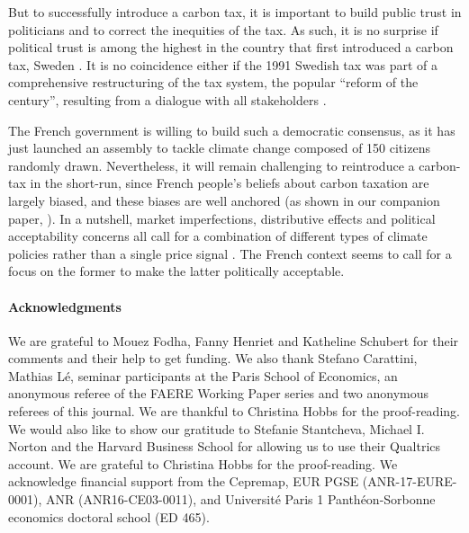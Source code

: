 \documentclass[english,5p,authoryear]{elsarticle}
\begin{document}
But to successfully introduce a carbon tax, it is important to build public trust in politicians \citep{harring_jagers_2013,rafaty_perceptions_2018} and to correct the inequities of the tax. As such, it is no surprise if political trust is among the highest in the country that first introduced a carbon tax, Sweden \citep{klenert_making_2018}. It is no coincidence either if the 1991 Swedish tax was part of a comprehensive restructuring of the tax system, the popular ``reform of the century'', resulting from a dialogue with all stakeholders \citep{sterner_environmental_2014}. 

The French government is willing to build such a democratic consensus, as it has just launched an assembly to tackle climate change composed of 150 citizens randomly drawn. Nevertheless, it will remain challenging to reintroduce a carbon-tax in the short-run, since French people's beliefs about carbon taxation are largely biased, and these biases are well anchored (as shown in our companion paper, \citealt{douenne_can_2019}). In a nutshell, market imperfections, distributive effects and political acceptability concerns all call for a combination of different types of climate policies rather than a single price signal \citep{stern_report_2017,stiglitz_addressing_2019}. The French context seems to call for a focus on the former to make the latter politically acceptable. 

%

%

%

%

%

%

%
%

%

%


\paragraph*{Acknowledgments} We are grateful to Mouez Fodha, Fanny Henriet and Katheline Schubert for their comments and their help to get funding. We also thank Stefano Carattini, Mathias Lé, seminar participants at the Paris School of Economics, an anonymous referee of the FAERE Working Paper series and two anonymous referees of this journal. We are thankful to Christina Hobbs for the proof-reading. We would also like to show our gratitude to Stefanie Stantcheva, Michael I. Norton and the Harvard Business School for allowing us to use their Qualtrics account. We are grateful to Christina Hobbs for the proof-reading. We acknowledge financial support from the Cepremap, EUR PGSE (ANR-17-EURE-0001), ANR (ANR16-CE03-0011), and Université Paris 1 Panthéon-Sorbonne economics doctoral school (ED 465).
\end{document}
